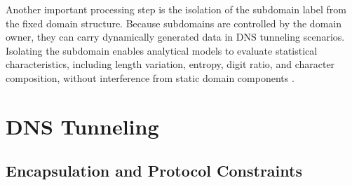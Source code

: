 \documentclass[14pt, a4paper, oneside]{report}
\begin{document}
Another important processing step is the isolation of the subdomain label from the fixed domain structure. Because subdomains are controlled by the domain owner, they can carry dynamically generated data in DNS tunneling scenarios. Isolating the subdomain enables analytical models to evaluate statistical characteristics, including length variation, entropy, digit ratio, and character composition, without interference from static domain components \cite{rfc1034,rfc1035}.

\section{DNS Tunneling}
\label{sec:dns_tunneling_theory}

\subsection{Encapsulation and Protocol Constraints}
\end{document}
